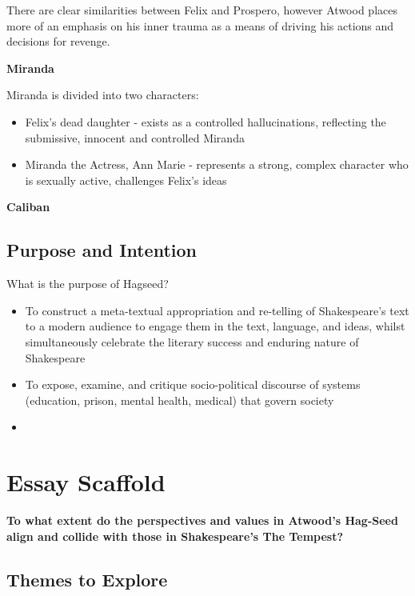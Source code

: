 			There are clear similarities between Felix and Prospero, however Atwood places more of an emphasis on his inner trauma as a means of driving his actions and decisions for revenge.

		\textbf{Miranda}

			Miranda is divided into two characters:

			\begin{itemize}
				\item Felix's dead daughter - exists as a controlled hallucinations, reflecting the submissive, innocent and controlled Miranda
				\item Miranda the Actress, Ann Marie - represents a strong, complex character who is sexually active, challenges Felix's ideas
			\end{itemize}

		\textbf{Caliban}

	\subsection{Purpose and Intention}

		What is the purpose of Hagseed?

		\begin{itemize}
			\item To construct a meta-textual appropriation and re-telling of Shakespeare's text to a modern audience to engage them in the text, language, and ideas, whilst simultaneously celebrate the literary success and enduring nature of Shakespeare
			\item To expose, examine, and critique socio-political discourse of systems (education, prison, mental health, medical) that govern society
			\item 
		\end{itemize}



\section{Essay Scaffold} \label{10/03/2025}

	\textbf{To what extent do the perspectives and values in Atwood's Hag-Seed align and collide with those in Shakespeare's The Tempest?}

	\subsection{Themes to Explore}

